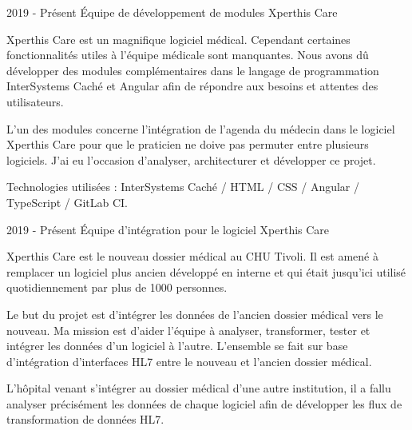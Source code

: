 

\begin{cventries}


    
  \cventry
    {2019 - Présent} %
    {Équipe de développement de modules Xperthis Care} %
    {} %
    {} %
    {
    Xperthis Care est un magnifique logiciel médical. Cependant certaines fonctionnalités utiles à l'équipe médicale sont manquantes.
    Nous avons dû développer des modules complémentaires dans le langage de programmation InterSystems Caché et Angular afin de répondre aux besoins et attentes des utilisateurs.

    L'un des modules concerne l'intégration de l'agenda du médecin dans le logiciel Xperthis Care pour que le praticien ne doive pas permuter entre plusieurs logiciels. J'ai eu l'occasion d'analyser, architecturer et développer ce projet.

    Technologies utilisées : InterSystems Caché / HTML / CSS / Angular / TypeScript / GitLab CI.

    }
    
    
  \cventry
    {2019 - Présent} %
    {Équipe d'intégration pour le logiciel Xperthis Care} %
    {} %
    {} %
    {
    Xperthis Care est le nouveau dossier médical au CHU Tivoli. Il est amené à remplacer un logiciel plus ancien développé en interne et qui était jusqu'ici utilisé quotidiennement par plus de 1000 personnes.
    
    Le but du projet est d'intégrer les données de l'ancien dossier médical vers le nouveau. Ma mission est d'aider l'équipe à analyser, transformer, tester et intégrer les données d'un logiciel à l'autre. L'ensemble se fait sur base d'intégration d'interfaces HL7 entre le nouveau et l'ancien dossier médical.
    
    L'hôpital venant s'intégrer au dossier médical d'une autre institution, il a fallu analyser précisément les données de chaque logiciel afin de développer les flux de transformation de données HL7.

}
\end{cventries}
